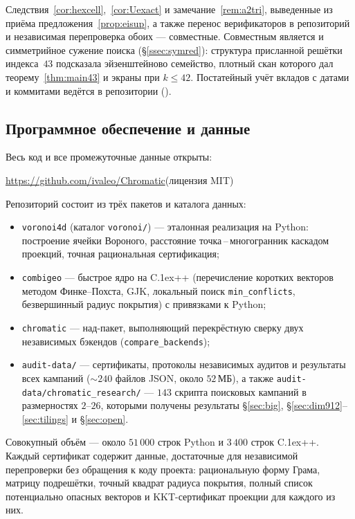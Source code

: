 Следствия~\ref{cor:hexcell},~\ref{cor:Uexact} и замечание~\ref{rem:a2tri},
выведенные из приёма предложения~\ref{prop:eisup}, а также перенос
верификаторов в репозиторий и независимая перепроверка обоих --- совместные.
Совместным является и симметрийное сужение поиска (\S\ref{ssec:symred}):
структура присланной решётки индекса~$43$ подсказала эйзенштейново семейство,
плотный скан которого дал теорему~\ref{thm:main43} и экраны при $k\le42$.
Постатейный учёт вкладов с датами и коммитами ведётся в репозитории
().

\subsection{Программное обеспечение и данные}

Весь код и все промежуточные данные открыты:
\begin{center}
\url{https://github.com/ivaleo/Chromatic}\quad (лицензия MIT)
\end{center}

Репозиторий состоит из трёх пакетов и каталога данных:
\begin{itemize}[leftmargin=1.4em,itemsep=1pt]
\item \texttt{voronoi4d} (каталог \texttt{voronoi/}) --- эталонная реализация на
Python: построение ячейки Вороного, расстояние точка\,--\,многогранник каскадом
проекций, точная рациональная сертификация;
\item \texttt{combigeo} --- быстрое ядро на C\raise.1ex\hbox{\small++}
(перечисление коротких векторов методом Финке--Похста, GJK, локальный поиск
\texttt{min\_conflicts}, безвершинный радиус покрытия) с привязками к Python;
\item \texttt{chromatic} --- над-пакет, выполняющий перекрёстную сверку двух
независимых бэкендов (\texttt{compare\_backends});
\item \texttt{audit-data/} --- сертификаты, протоколы независимых аудитов и
результаты всех кампаний (${\sim}240$ файлов JSON, около $52$\,МБ), а также
\texttt{audit-data/chromatic\_research/} --- $143$ скрипта поисковых кампаний
в размерностях $2$--$26$, которыми получены результаты \S\ref{sec:big},
\S\ref{sec:dim912}--\ref{sec:tilings} и \S\ref{sec:open}.
\end{itemize}

Совокупный объём --- около $51\,000$ строк Python и $3\,400$ строк
C\raise.1ex\hbox{\small++}. Каждый сертификат содержит данные, достаточные для
независимой перепроверки без обращения к коду проекта: рациональную форму Грама,
матрицу подрешётки, точный квадрат радиуса покрытия, полный список
потенциально опасных векторов и KKT-сертификат проекции для каждого из них.

